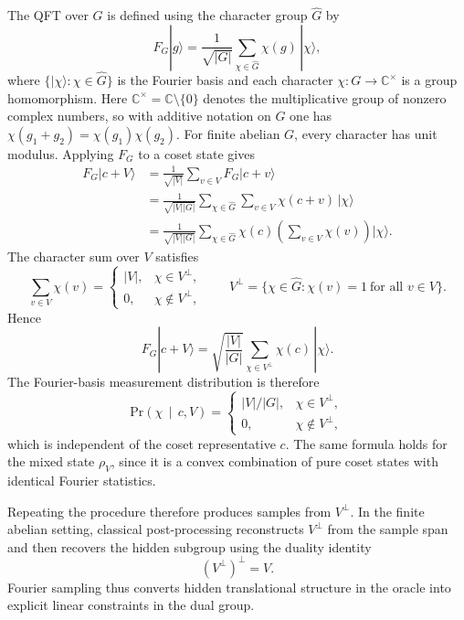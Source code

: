 The QFT over $G$ is defined using the character group $\hat{G}$ by
\begin{equation}
F_G|g\rangle = \frac{1}{\sqrt{|G|}} \sum_{\chi\in\hat{G}} \chi(g)\,|\chi\rangle,
\end{equation}
where $\{|\chi\rangle:\chi\in\hat{G}\}$ is the Fourier basis and each character $\chi:G\to \mathbb{C}^\times$ is a group homomorphism. Here $\mathbb{C}^\times=\mathbb{C}\setminus\{0\}$ denotes the multiplicative group of nonzero complex numbers, so with additive notation on $G$ one has $\chi(g_1+g_2)=\chi(g_1)\chi(g_2)$. For finite abelian $G$, every character has unit modulus. Applying $F_G$ to a coset state gives
\begin{align}
F_G|c+V\rangle
&= \frac{1}{\sqrt{|V|}} \sum_{v\in V} F_G|c+v\rangle \nonumber\\
&= \frac{1}{\sqrt{|V||G|}} \sum_{\chi\in\hat{G}} \sum_{v\in V} \chi(c+v)\,|\chi\rangle \nonumber\\
&= \frac{1}{\sqrt{|V||G|}} \sum_{\chi\in\hat{G}} \chi(c)\left(\sum_{v\in V}\chi(v)\right)|\chi\rangle.
\end{align}
The character sum over $V$ satisfies
\begin{equation}
\sum_{v\in V}\chi(v)=
\begin{cases}
|V|,& \chi\in V^\perp,\\
0,& \chi\notin V^\perp,
\end{cases}
\qquad
V^\perp=\{\chi\in\hat{G}:\chi(v)=1\ \text{for all }v\in V\}.
\end{equation}
Hence
\begin{equation}
F_G|c+V\rangle
=
\sqrt{\frac{|V|}{|G|}}
\sum_{\chi\in V^\perp} \chi(c)\,|\chi\rangle.
\end{equation}
The Fourier-basis measurement distribution is therefore
\begin{equation}
\text{Pr}(\chi\,\mid\,c,V)=
\begin{cases}
|V|/|G|,& \chi\in V^\perp,\\
0,& \chi\notin V^\perp,
\end{cases}
\end{equation}
which is independent of the coset representative $c$. The same formula holds for the mixed state $\rho_V$, since it is a convex combination of pure coset states with identical Fourier statistics.

Repeating the procedure therefore produces samples from $V^\perp$. In the finite abelian setting, classical post-processing reconstructs $V^\perp$ from the sample span and then recovers the hidden subgroup using the duality identity \cite{Kitaev1995,EttingerHoyerKnill2004,Lomont2004}
\begin{equation}
(V^\perp)^\perp = V.
\end{equation}
Fourier sampling thus converts hidden translational structure in the oracle into explicit linear constraints in the dual group.

